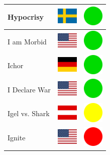 \documentclass[12pt, a4paper, twoside]{report}
\begin{document}
\begin{center}
\begin{longtable}{|p{5cm}|p{2cm}|p{2cm}|}
 Hypocrisy                                                  & \includegraphics[width=1cm]{4x3/se} &   \includegraphics[width=1cm]{likes/y} \\ \hline
 I am Morbid                                                & \includegraphics[width=1cm]{4x3/us} &   \includegraphics[width=1cm]{likes/y} \\ \hline
 Ichor                                                      & \includegraphics[width=1cm]{4x3/de} &   \includegraphics[width=1cm]{likes/y} \\ \hline
 I Declare War                                              & \includegraphics[width=1cm]{4x3/us} &   \includegraphics[width=1cm]{likes/y} \\ \hline
 Igel vs. Shark                                             & \includegraphics[width=1cm]{4x3/at} &   \includegraphics[width=1cm]{likes/m} \\ \hline
 Ignite                                                     & \includegraphics[width=1cm]{4x3/us} &   \includegraphics[width=1cm]{likes/n} \\ \hline

\end{longtable}
\end{center}
\end{document}
